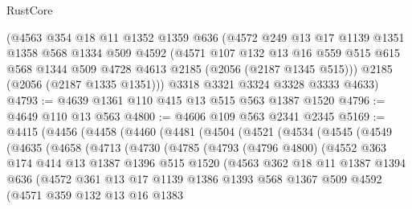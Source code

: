 \begin{lexlean}{RustCore}
\begin{coremodule}
    (@4563
      @354
      @18
      @11
      @1352
      @1359
      @636
      (@4572
        @249
        @13
        @17
        @1139
        @1351
        @1358
        @568
        @1334
        @509
        @4592
        (@4571
          @107
          @132
          @13
          @16
          @559
          @515
          @615
          @568
          @1344
          @509
          @4728
          @4613
          @2185
          (@2056 (@2187 @1345 @515)))
        @2185
        (@2056 (@2187 @1335 @1351)))
      @3318
      @3321
      @3324
      @3328
      @3333
      @4633)
@4793 := @4639 @1361 @110 @415 @13 @515 @563 @1387 @1520
@4796 := @4649 @110 @13 @563
@4800 := @4606 @109 @563 @2341 @2345
@5169 := @4415
    (@4456
      (@4458
        (@4460
          (@4481
            (@4504
              (@4521
                (@4534
                  (@4545
                    (@4549
                      (@4635
                        (@4658
                          (@4713
                            (@4730
                              (@4785
                                (@4793
                                  (@4796 @4800)
                                  (@4552
                                    @363
                                    @174
                                    @414
                                    @13
                                    @1387
                                    @1396
                                    @515
                                    @1520
                                    (@4563
                                      @362
                                      @18
                                      @11
                                      @1387
                                      @1394
                                      @636
                                      (@4572
                                        @361
                                        @13
                                        @17
                                        @1139
                                        @1386
                                        @1393
                                        @568
                                        @1367
                                        @509
                                        @4592
                                        (@4571
                                          @359
                                          @132
                                          @13
                                          @16
                                          @1383

\end{coremodule}
\end{lexlean}

